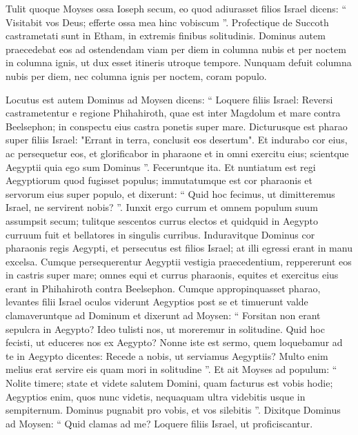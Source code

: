 \begin{biblechapter}
\begin{biblechapter}
\begin{biblechapter}
\begin{biblechapter}
\begin{biblechapter}
\begin{biblechapter}
\begin{biblechapter}
\begin{biblechapter}
\begin{biblechapter}
\begin{biblechapter}
\begin{biblechapter}
\begin{biblechapter}
\begin{biblechapter}
\verse Tulit quoque Moyses ossa Ioseph secum, eo quod adiurasset filios Israel dicens: “ Visitabit vos Deus; efferte ossa mea hinc vobiscum ”.
 \verse Profectique de Succoth castrametati sunt in Etham, in extremis finibus solitudinis. 
\verse Dominus autem praecedebat eos ad ostendendam viam per diem in columna nubis et per noctem in columna ignis, ut dux esset itineris utroque tempore. 
\verse Nunquam defuit columna nubis per diem, nec columna ignis per noctem, coram populo.
 
\begin{biblechapter}
\verse Locutus est autem Dominus ad Moysen dicens: 
\verse “ Loquere filiis Israel: Reversi castrametentur e regione Phihahiroth, quae est inter Magdolum et mare contra Beelsephon; in conspectu eius castra ponetis super mare. 
\verse Dicturusque est pharao super filiis Israel: "Errant in terra, conclusit eos desertum". 
\verse Et indurabo cor eius, ac persequetur eos, et glorificabor in pharaone et in omni exercitu eius; scientque Aegyptii quia ego sum Dominus ”. Feceruntque ita.
 \verse Et nuntiatum est regi Aegyptiorum quod fugisset populus; immutatumque est cor pharaonis et servorum eius super populo, et dixerunt: “ Quid hoc fecimus, ut dimitteremus Israel, ne servirent nobis? ”. 
\verse Iunxit ergo currum et omnem populum suum assumpsit secum; 
\verse tulitque sescentos currus electos et quidquid in Aegypto curruum fuit et bellatores in singulis curribus. 
\verse Induravitque Dominus cor pharaonis regis Aegypti, et persecutus est filios Israel; at illi egressi erant in manu excelsa. 
\verse Cumque persequerentur Aegyptii vestigia praecedentium, reppererunt eos in castris super mare; omnes equi et currus pharaonis, equites et exercitus eius erant in Phihahiroth contra Beelsephon.
 \verse Cumque appropinquasset pharao, levantes filii Israel oculos viderunt Aegyptios post se et timuerunt valde clamaveruntque ad Dominum 
\verse et dixerunt ad Moysen: “ Forsitan non erant sepulcra in Aegypto? Ideo tulisti nos, ut moreremur in solitudine. Quid hoc fecisti, ut educeres nos ex Aegypto? 
\verse Nonne iste est sermo, quem loquebamur ad te in Aegypto dicentes: Recede a nobis, ut serviamus Aegyptiis? Multo enim melius erat servire eis quam mori in solitudine ”. 
\verse Et ait Moyses ad populum: “ Nolite timere; state et videte salutem Domini, quam facturus est vobis hodie; Aegyptios enim, quos nunc videtis, nequaquam ultra videbitis usque in sempiternum. 
\verse Dominus pugnabit pro vobis, et vos silebitis ”.
 \verse Dixitque Dominus ad Moysen: “ Quid clamas ad me? Loquere filiis Israel, ut proficiscantur. 

\end{biblechapter}
\end{biblechapter}
\end{biblechapter}
\end{biblechapter}
\end{biblechapter}
\end{biblechapter}
\end{biblechapter}
\end{biblechapter}
\end{biblechapter}
\end{biblechapter}
\end{biblechapter}
\end{biblechapter}
\end{biblechapter}
\end{biblechapter}
